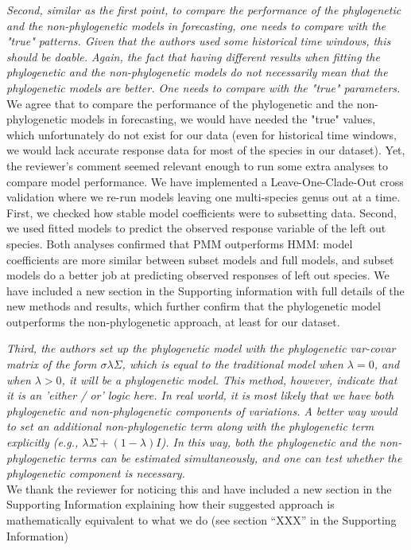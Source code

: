 \documentclass[11pt]{article}
\begin{document}
\emph{Second, similar as the first point, to compare the performance of the phylogenetic and the non-phylogenetic models in forecasting, one needs to compare with the "true" patterns. Given that the authors used some historical time windows, this should be doable. Again, the fact that having different results when fitting the phylogenetic and the non-phylogenetic models do not necessarily mean that the phylogenetic models are better. One needs to compare with the "true" parameters.}\\
We agree that to compare the performance of the phylogenetic and the non-phylogenetic models in forecasting, we would have needed the "true" values, which unfortunately do not exist for our data (even for historical time windows, we would lack accurate response data for most of the species in our dataset). Yet, the reviewer's comment seemed relevant enough to run some extra analyses to compare model performance. We have implemented a Leave-One-Clade-Out cross validation where we re-run models leaving one multi-species genus out at a time. First, we checked how stable model coefficients were to subsetting data. Second, we used fitted models to predict the observed response variable of the left out species. Both analyses confirmed that PMM outperforms HMM: model coefficients are more similar between subset models and full models, and subset models do a better job at predicting observed responses of left out species. We have included a new section in the Supporting information with full details of the new methods and results, which further confirm that the phylogenetic model outperforms the non-phylogenetic approach, at least for our dataset.


\emph{Third, the authors set up the phylogenetic model with the phylogenetic var-covar matrix of the form $\sigma\lambda\Sigma$, which is equal to the traditional model when $\lambda=0$, and when $\lambda>0$, it will be a phylogenetic model. This method, however, indicate that it is an 'either / or' logic here. In real world, it is most likely that we have both phylogenetic and non-phylogenetic components of variations. A better way would to set an additional non-phylogenetic term along with the phylogenetic term explicitly (e.g., $\lambda \Sigma + (1-\lambda)I$). In this way, both the phylogenetic and the non-phylogenetic terms can be estimated simultaneously, and one can test whether the phylogenetic component is necessary.}\\
We thank the reviewer for noticing this and have included a new section in the Supporting Information explaining how their suggested approach is mathematically equivalent to what we do (see section ``XXX'' in the Supporting Information)
\end{document}

